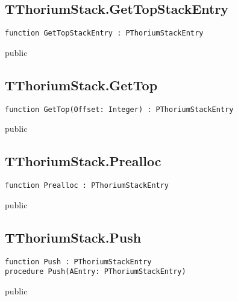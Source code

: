 \subsection{TThoriumStack.GetTopStackEntry}
\label{thoriumcorepkg:thorium:tthoriumstack:gettopstackentry}
\begin{FPCList}
\Declaration 

\begin{verbatim}
function GetTopStackEntry : PThoriumStackEntry
\end{verbatim}
\Visibility
public
\end{FPCList}
\subsection{TThoriumStack.GetTop}
\label{thoriumcorepkg:thorium:tthoriumstack:gettop}
\begin{FPCList}
\Declaration 

\begin{verbatim}
function GetTop(Offset: Integer) : PThoriumStackEntry
\end{verbatim}
\Visibility
public
\end{FPCList}
\subsection{TThoriumStack.Prealloc}
\label{thoriumcorepkg:thorium:tthoriumstack:prealloc}
\begin{FPCList}
\Declaration 

\begin{verbatim}
function Prealloc : PThoriumStackEntry
\end{verbatim}
\Visibility
public
\end{FPCList}
\subsection{TThoriumStack.Push}
\label{thoriumcorepkg:thorium:tthoriumstack:push}
\begin{FPCList}
\Declaration 

\begin{verbatim}
function Push : PThoriumStackEntry
procedure Push(AEntry: PThoriumStackEntry)
\end{verbatim}
\Visibility
public
\end{FPCList}
